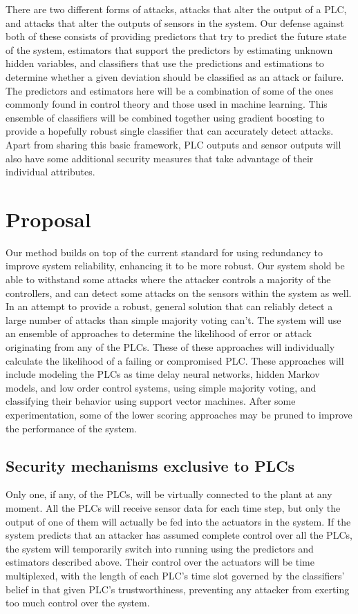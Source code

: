 \documentclass[10pt,twocolumn]{IEEEtran}
\begin{document}
There are two different forms of attacks, attacks that alter the output of a PLC, and attacks that alter the outputs of sensors in the system.
Our defense against both of these consists of providing predictors that try to predict the future state of the system, estimators that support the predictors by estimating unknown hidden variables, and classifiers that use the predictions and estimations to determine whether a given deviation should be classified as an attack or failure.
The predictors and estimators here will be a combination of some of the ones commonly found in control theory and those used in machine learning.
This ensemble of classifiers will be combined together using gradient boosting to provide a hopefully robust single classifier that can accurately detect attacks.
Apart from sharing this basic framework, PLC outputs and sensor outputs will also have some additional security measures that take advantage of their individual attributes.

\section{Proposal}
Our method builds on top of the current standard for using redundancy to improve system reliability, enhancing it to be more robust.
Our system shold be able to withstand some attacks where the attacker controls a majority of the controllers, and can detect some attacks on the sensors within the system as well.
In an attempt to provide a robust, general solution that can reliably detect a large number of attacks than simple majority voting can't.
The system will use an ensemble of approaches to determine the likelihood of error or attack originating from any of the PLCs.
These of these approaches will individually calculate the likelihood of a failing or compromised PLC.
These approaches will include modeling the PLCs as time delay neural networks, hidden Markov models, and low order control systems, using simple majority voting, and classifying their behavior using support vector machines.
After some experimentation, some of the lower scoring approaches may be pruned to improve the performance of the system.

\subsection{Security mechanisms exclusive to PLCs}
Only one, if any, of the PLCs, will be virtually connected to the plant at any moment.
All the PLCs will receive sensor data for each time step, but only the output of one of them will actually be fed into the actuators in the system.
If the system predicts that an attacker has assumed complete control over all the PLCs, the system will temporarily switch into running using the predictors and estimators described above.
Their control over the actuators will be time multiplexed, with the length of each PLC's time slot governed by the classifiers' belief in that given PLC's trustworthiness, preventing any attacker from exerting too much control over the system.
\end{document}
